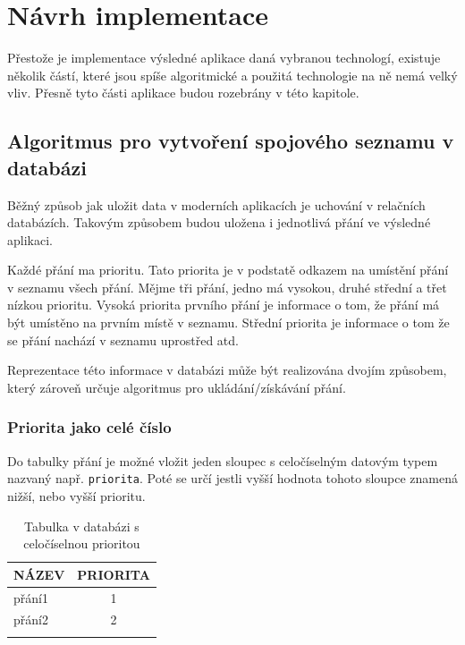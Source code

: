 \section{Návrh implementace}
Přestože je implementace výsledné aplikace daná vybranou technologí, existuje několik částí, které jsou spíše algoritmické a použitá technologie na ně nemá velký vliv. Přesně tyto části aplikace budou rozebrány v této kapitole.

\subsection{Algoritmus pro vytvoření spojového seznamu v databázi}
Běžný způsob jak uložit data v moderních aplikacích je uchování v relačních databázích. Takovým způsobem budou uložena i jednotlivá přání ve výsledné aplikaci.

Každé přání ma prioritu. Tato priorita je v podstatě odkazem na umístění přání v seznamu všech přání. Mějme tři přání, jedno má vysokou, druhé střední a třet nízkou prioritu. Vysoká priorita prvního přání je informace o tom, že přání má být umístěno na prvním místě v seznamu. Střední priorita je informace o tom že se přání nachází v seznamu uprostřed atd.

Reprezentace této informace v databázi může být realizována dvojím způsobem, který zároveň určuje algoritmus pro ukládání/získávání přání.

\subsubsection{Priorita jako celé číslo}
Do tabulky přání je možné vložit jeden sloupec s celočíselným datovým typem nazvaný např. \verb|priorita|. Poté se určí jestli vyšší hodnota tohoto sloupce znamená nižší, nebo vyšší prioritu.
\begin{table}
	\begin{center}
	  \begin{tabular}{ | l | c | }
	    \hline
	    NÁZEV & PRIORITA  \\ \hline \hline
	    přání1 & 1  \\ \hline
	    přání2 & 2 \\ \hline
	     &  \\ \hline
	  \end{tabular}
	  \caption{Tabulka v databázi s celočíselnou prioritou}
	  \label{tab:integer-priority}
	\end{center}
\end{table}


